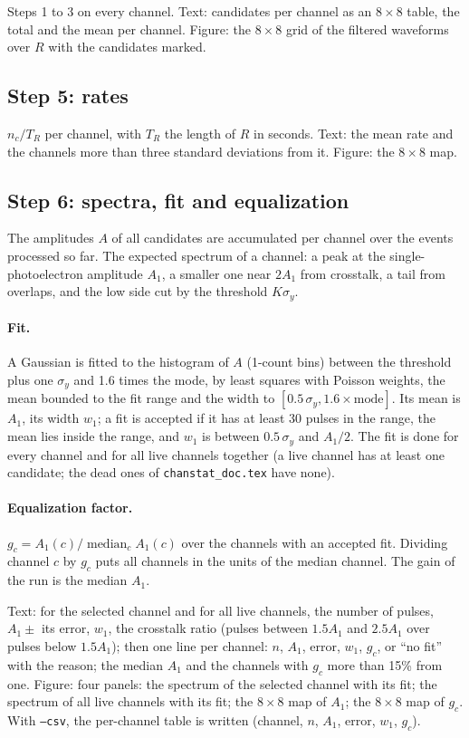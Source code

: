 \documentclass[11pt]{article}
\newcommand{\code}[1]{\texttt{#1}}
\begin{document}
Steps 1 to 3 on every channel. Text: candidates per channel as an
$8\times8$ table, the total and the mean per channel. Figure: the
$8\times8$ grid of the filtered waveforms over $R$ with the candidates
marked.

\subsection{Step 5: rates}

$n_c / T_R$ per channel, with $T_R$ the length of $R$ in seconds. Text:
the mean rate and the channels more than three standard deviations from
it. Figure: the $8\times8$ map.

\subsection{Step 6: spectra, fit and equalization}

The amplitudes $A$ of all candidates are accumulated per channel over
the events processed so far. The expected spectrum of a channel: a peak
at the single-photoelectron amplitude $A_1$, a smaller one near $2 A_1$
from crosstalk, a tail from overlaps, and the low side cut by the
threshold $K \sigma_y$.

\paragraph{Fit.} A Gaussian is fitted to the histogram of $A$ (1-count
bins) between the threshold plus one $\sigma_y$ and 1.6 times the mode,
by least squares with Poisson weights, the mean bounded to the fit range
and the width to $[0.5\,\sigma_y, 1.6 \times \mathrm{mode}]$. Its mean is $A_1$, its width
$w_1$; a fit is accepted if it has at least 30 pulses in the range, the
mean lies inside the range, and $w_1$ is between $0.5\,\sigma_y$ and
$A_1 / 2$. The fit is done for every channel and for all live channels
together (a live channel has at least one candidate; the dead ones of
\code{chanstat\_doc.tex} have none).

\paragraph{Equalization factor.} $g_c = A_1(c) / \operatorname{median}_c
A_1(c)$ over the channels with an accepted fit. Dividing channel $c$ by
$g_c$ puts all channels in the units of the median channel. The gain of
the run is the median $A_1$.

Text: for the selected channel and for all live channels, the number of
pulses, $A_1 \pm$ its error, $w_1$, the crosstalk ratio (pulses between
$1.5 A_1$ and $2.5 A_1$ over pulses below $1.5 A_1$); then one line per
channel: $n$, $A_1$, error, $w_1$, $g_c$, or ``no fit'' with the reason;
the median $A_1$ and the channels with $g_c$ more than 15\% from one.
Figure: four panels: the spectrum of the selected channel with its fit;
the spectrum of all live channels with its fit; the $8\times8$ map of
$A_1$; the $8\times8$ map of $g_c$. With \code{--csv}, the per-channel
table is written (channel, $n$, $A_1$, error, $w_1$, $g_c$).
\end{document}
